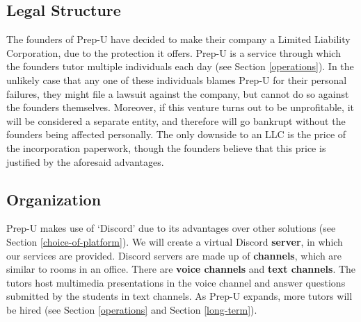 \documentclass{business}
\begin{document}
    \subsection{Legal Structure}
    The founders of Prep-U have decided to make their company a Limited Liability Corporation, due to the protection it offers. Prep-U is a service through which the founders tutor multiple individuals each day (see Section \ref{operations}). In the unlikely case that any one of these individuals blames Prep-U for their personal failures, they might file a lawsuit against the company, but cannot do so against the founders themselves. Moreover, if this venture turns out to be unprofitable, it will be considered a separate entity, and therefore will go bankrupt without the founders being affected personally. The only downside to an LLC is the price of the incorporation paperwork, though the founders believe that this price is justified by the aforesaid advantages.
    \subsection{Organization}
    Prep-U makes use of `Discord' due to its advantages over other solutions (see Section \ref{choice-of-platform}). We will create a virtual Discord \textbf{server}, in which our services are provided. Discord servers are made up of \textbf{channels}, which are similar to rooms in an office. There are \textbf{voice channels} and \textbf{text channels}. The tutors host multimedia presentations in the voice channel and answer questions submitted by the students in text channels. As Prep-U expands, more tutors will be hired (see Section \ref{operations} and Section \ref{long-term}).
\end{document}
